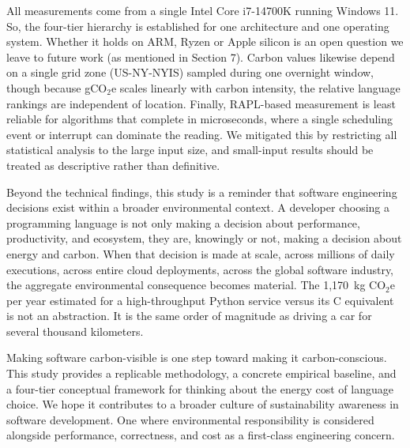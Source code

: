 All measurements come from a single Intel Core i7-14700K running Windows 11. So, the four-tier hierarchy is established for one architecture and one operating system. Whether it holds on ARM, Ryzen or Apple silicon is an open question we leave to future work (as mentioned in Section 7).  Carbon values likewise depend on a single grid zone (US-NY-NYIS) sampled during one overnight window, though because gCO$_2$e scales linearly with carbon intensity, the relative language rankings are independent of location. Finally, RAPL-based measurement is least reliable for algorithms that complete in microseconds, where a single scheduling event or interrupt can dominate the reading. We mitigated this by restricting all statistical analysis to the large input size, and small-input results should be treated as descriptive rather than definitive.

Beyond the technical findings, this study is a reminder that software engineering decisions exist within a broader environmental context. A developer choosing a programming language is not only making a decision about performance, productivity, and ecosystem, they are, knowingly or not, making a decision about energy and carbon. When that decision is made at scale, across millions of daily executions, across entire cloud deployments, across the global software industry, the aggregate environmental consequence becomes material. The 1,170~kg CO$_2$e per year estimated for a high-throughput Python service versus its C equivalent is not an abstraction. It is the same order of magnitude as driving a car for several thousand kilometers.
 
Making software carbon-visible is one step toward making it carbon-conscious. This study provides a replicable methodology, a concrete empirical baseline, and a four-tier conceptual framework for thinking about the energy cost of language choice. We hope it contributes to a broader culture of sustainability awareness in software development. One where environmental responsibility is considered alongside performance, correctness, and cost as a first-class engineering concern.